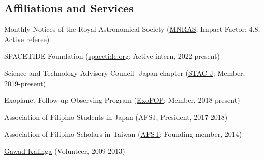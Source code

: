 \documentclass[12pt,letterpaper]{article}
\begin{document}
\subsection{Affiliations and Services}
\begin{list}{}{\cvlist}
    \item Monthly Notices of the Royal Astronomical Society (\href{https://academic.oup.com/mnras}{MNRAS}; Impact Factor: 4.8; Active referee)
    \item SPACETIDE Foundation (\href{https://spacetide.jp/en/}{spacetide.org}; Active intern, 2022-present)
    \item Science and Technology Advisory Council- Japan chapter (\href{https://www.facebook.com/profile.php?id=100083271798519}{STAC-J}; Member, 2019-present)
    \item Exoplanet Follow-up Observing Program (\href{https://exofop.ipac.caltech.edu/tess/}{ExoFOP}; Member, 2018-present)
    \item Association of Filipino Students in Japan (\href{https://www.facebook.com/afsjpage}{AFSJ}; President, 2017-2018)
    \item Association of Filipino Scholars in Taiwan (\href{https://www.facebook.com/AssocIskolar}{AFST}; Founding member, 2014)
    \item \href{https://gk1world.com/volunteer}{Gawad Kalinga} (Volunteer, 2009-2013)
\end{list}
\end{document}
